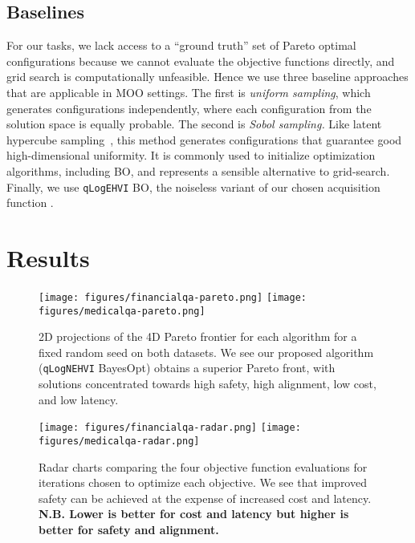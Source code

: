 \subsection{Baselines}
For our tasks, we lack access to a ``ground truth'' set of Pareto optimal configurations because we cannot evaluate the objective functions directly, and grid search is computationally unfeasible. Hence we use three baseline approaches that are applicable in MOO settings. The first is \emph{uniform sampling}, which generates configurations independently, where each configuration from the solution space is equally probable. %
The second is \emph{Sobol sampling.} Like latent hypercube sampling~\citep{loh1996latin},  this method generates configurations that guarantee good high-dimensional uniformity. It is commonly used to initialize optimization algorithms, including BO, and represents a sensible alternative to grid-search. Finally, we use \texttt{qLogEHVI} BO, the noiseless variant of our chosen acquisition function \citep{daulton2020differentiable}.

\section{Results}
\label{sec:results}

\begin{figure}[t]
    \centering
    \texttt{[image: figures/financialqa-pareto.png]}
    \texttt{[image: figures/medicalqa-pareto.png]}
    \caption{2D projections of the 4D Pareto frontier for each algorithm for a fixed random seed on both datasets. We see our proposed algorithm (\texttt{qLogNEHVI} BayesOpt) obtains a superior Pareto front, with solutions concentrated towards high safety, high alignment, low cost, and low latency.}
    \label{fig:pareto-front}
\end{figure}
\begin{figure}[t]
\centering
   \texttt{[image: figures/financialqa-radar.png]}
   \texttt{[image: figures/medicalqa-radar.png]}
    \caption{Radar charts comparing the four objective function evaluations for iterations chosen to optimize each objective. We see that improved safety can be achieved at the expense of increased cost and latency. \textbf{N.B. Lower is better for cost and latency but higher is better for safety and alignment.}}
    \label{fig:radar}
\end{figure}


